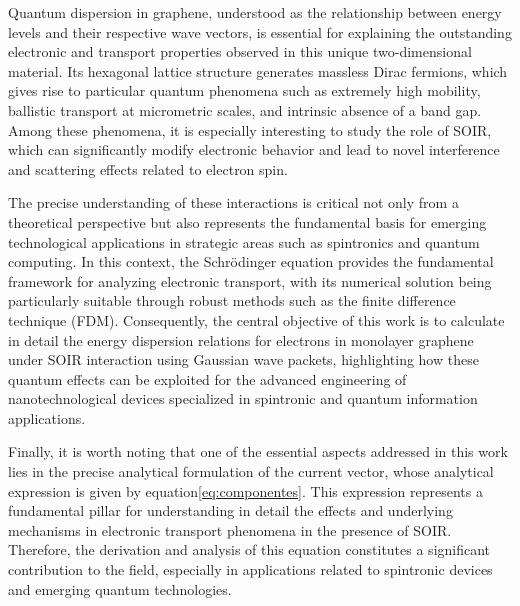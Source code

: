 Quantum dispersion in graphene, understood as the relationship between energy levels and their respective wave vectors, is essential for explaining the outstanding electronic and transport properties observed in this unique two-dimensional material.
Its hexagonal lattice structure generates massless Dirac fermions, which gives rise to particular quantum phenomena such as extremely high mobility, ballistic transport at micrometric scales, and intrinsic absence of a band gap\cite{Serna2019}.
Among these phenomena, it is especially interesting to study the role of SOIR, which can significantly modify electronic behavior and lead to novel interference and scattering effects related to electron spin.

The precise understanding of these interactions is critical not only from a theoretical perspective but also represents the fundamental basis for emerging technological applications in strategic areas such as spintronics and quantum computing\cite{WeizheMaterials2017, AvsarNatCommun2014, LiuNano2023}.
In this context, the Schrödinger equation provides the fundamental framework for analyzing electronic transport, with its numerical solution being particularly suitable through robust methods such as the finite difference technique (FDM).
Consequently, the central objective of this work is to calculate in detail the energy dispersion relations for electrons in monolayer graphene under SOIR interaction using Gaussian wave packets, highlighting how these quantum effects can be exploited for the advanced engineering of nanotechnological devices specialized in spintronic and quantum information applications.


Finally, it is worth noting that one of the essential aspects addressed in this work lies in the precise analytical formulation of the current vector, whose analytical expression is given by equation\eqref{eq:componentes}.
This expression represents a fundamental pillar for understanding in detail the effects and underlying mechanisms in electronic transport phenomena in the presence of SOIR\@.
Therefore, the derivation and analysis of this equation constitutes a significant contribution to the field, especially in applications related to spintronic devices and emerging quantum technologies.


%

